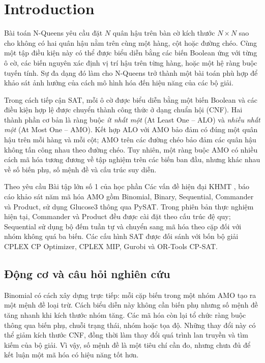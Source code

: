 \section{Introduction}
\label{sec:intro}

Bài toán N-Queens yêu cầu đặt $N$ quân hậu trên bàn cờ kích thước $N\times N$ sao cho không có hai quân hậu nằm trên cùng một hàng, cột hoặc đường chéo. Cùng một tập điều kiện này có thể được biểu diễn bằng các biến Boolean ứng với từng ô cờ, các biến nguyên xác định vị trí hậu trên từng hàng, hoặc một hệ ràng buộc tuyến tính. Sự đa dạng đó làm cho N-Queens trở thành một bài toán phù hợp để khảo sát ảnh hưởng của cách mô hình hóa đến hiệu năng của các bộ giải.

Trong cách tiếp cận SAT, mỗi ô cờ được biểu diễn bằng một biến Boolean và các điều kiện hợp lệ được chuyển thành công thức ở dạng chuẩn hội (CNF). Hai thành phần cơ bản là ràng buộc \emph{ít nhất một} (At Least One -- ALO) và \emph{nhiều nhất một} (At Most One -- AMO). Kết hợp ALO với AMO bảo đảm có đúng một quân hậu trên mỗi hàng và mỗi cột; AMO trên các đường chéo bảo đảm các quân hậu không tấn công nhau theo đường chéo. Tuy nhiên, một ràng buộc AMO có nhiều cách mã hóa tương đương về tập nghiệm trên các biến ban đầu, nhưng khác nhau về số biến phụ, số mệnh đề và cấu trúc suy diễn.

Theo yêu cầu Bài tập lớn số 1 của học phần Các vấn đề hiện đại KHMT \citep{assignment}, báo cáo khảo sát năm mã hóa AMO gồm Binomial, Binary, Sequential, Commander và Product, sử dụng Glucose3 thông qua PySAT. Trong phiên bản thực nghiệm hiện tại, Commander và Product đều được cài đặt theo cấu trúc đệ quy; Sequential sử dụng bộ đếm tuần tự và chuyển sang mã hóa theo cặp đối với nhóm không quá ba biến. Các cấu hình SAT được đối sánh với bốn bộ giải CPLEX CP Optimizer, CPLEX MIP, Gurobi và OR-Tools CP-SAT.

\subsection{Động cơ và câu hỏi nghiên cứu}

Binomial có cách xây dựng trực tiếp: mỗi cặp biến trong một nhóm AMO tạo ra một mệnh đề loại trừ. Cách biểu diễn này không cần biến phụ nhưng số mệnh đề tăng nhanh khi kích thước nhóm tăng. Các mã hóa còn lại tổ chức ràng buộc thông qua biến phụ, chuỗi trạng thái, nhóm hoặc tọa độ. Những thay đổi này có thể giảm kích thước CNF, đồng thời làm thay đổi quá trình lan truyền và tìm kiếm của bộ giải. Vì vậy, số mệnh đề là một tiêu chí cần đo, nhưng chưa đủ để kết luận một mã hóa có hiệu năng tốt hơn.

